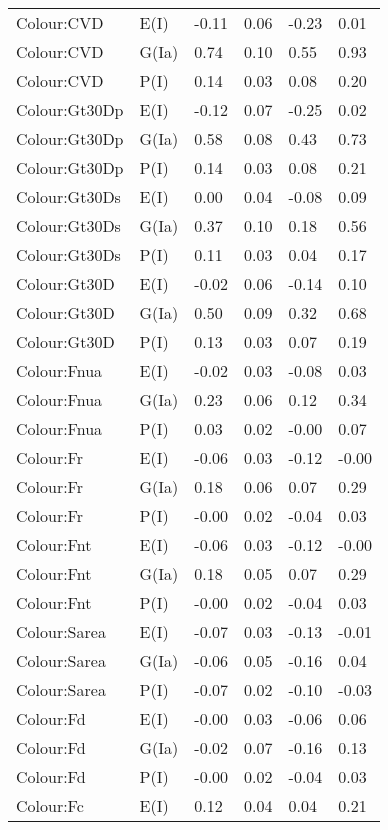 \begin{center}
\begin{longtable}{|p{1.1in}|p{0.7in}|p{0.7in}|p{0.6in}|p{0.6in}|p{0.6in}|}
  Colour:CVD & E(I) & -0.11 & 0.06 & -0.23 & 0.01 \\ 
  Colour:CVD & G(Ia) & 0.74 & 0.10 & 0.55 & 0.93 \\ 
  Colour:CVD & P(I) & 0.14 & 0.03 & 0.08 & 0.20 \\ 
  Colour:Gt30Dp & E(I) & -0.12 & 0.07 & -0.25 & 0.02 \\ 
  Colour:Gt30Dp & G(Ia) & 0.58 & 0.08 & 0.43 & 0.73 \\ 
  Colour:Gt30Dp & P(I) & 0.14 & 0.03 & 0.08 & 0.21 \\ 
  Colour:Gt30Ds & E(I) & 0.00 & 0.04 & -0.08 & 0.09 \\ 
  Colour:Gt30Ds & G(Ia) & 0.37 & 0.10 & 0.18 & 0.56 \\ 
  Colour:Gt30Ds & P(I) & 0.11 & 0.03 & 0.04 & 0.17 \\ 
  Colour:Gt30D & E(I) & -0.02 & 0.06 & -0.14 & 0.10 \\ 
  Colour:Gt30D & G(Ia) & 0.50 & 0.09 & 0.32 & 0.68 \\ 
  Colour:Gt30D & P(I) & 0.13 & 0.03 & 0.07 & 0.19 \\ 
  Colour:Fnua & E(I) & -0.02 & 0.03 & -0.08 & 0.03 \\ 
  Colour:Fnua & G(Ia) & 0.23 & 0.06 & 0.12 & 0.34 \\ 
  Colour:Fnua & P(I) & 0.03 & 0.02 & -0.00 & 0.07 \\ 
  Colour:Fr & E(I) & -0.06 & 0.03 & -0.12 & -0.00 \\ 
  Colour:Fr & G(Ia) & 0.18 & 0.06 & 0.07 & 0.29 \\ 
  Colour:Fr & P(I) & -0.00 & 0.02 & -0.04 & 0.03 \\ 
  Colour:Fnt & E(I) & -0.06 & 0.03 & -0.12 & -0.00 \\ 
  Colour:Fnt & G(Ia) & 0.18 & 0.05 & 0.07 & 0.29 \\ 
  Colour:Fnt & P(I) & -0.00 & 0.02 & -0.04 & 0.03 \\ 
  Colour:Sarea & E(I) & -0.07 & 0.03 & -0.13 & -0.01 \\ 
  Colour:Sarea & G(Ia) & -0.06 & 0.05 & -0.16 & 0.04 \\ 
  Colour:Sarea & P(I) & -0.07 & 0.02 & -0.10 & -0.03 \\ 
  Colour:Fd & E(I) & -0.00 & 0.03 & -0.06 & 0.06 \\ 
  Colour:Fd & G(Ia) & -0.02 & 0.07 & -0.16 & 0.13 \\ 
  Colour:Fd & P(I) & -0.00 & 0.02 & -0.04 & 0.03 \\ 
  Colour:Fc & E(I) & 0.12 & 0.04 & 0.04 & 0.21 \\ 

\end{longtable}
\end{center}
